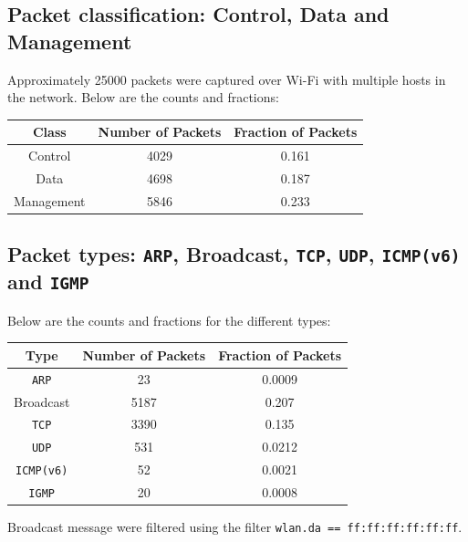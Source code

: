 \documentclass{article}
\begin{document}
\subsection{Packet classification: Control, Data and Management}
\begin{flushleft}
Approximately 25000 packets were captured over Wi-Fi with multiple hosts in the network. Below are the counts and fractions:
\begin{center}
\begin{tabular}{|c|c|c|}
\hline
Class & Number of Packets & Fraction of Packets \\
\hline
\hline
Control & 4029 & 0.161 \\
\hline
Data & 4698 & 0.187 \\
\hline
Management & 5846 & 0.233 \\
\hline
\end{tabular}
\end{center}
\end{flushleft}

\subsection{Packet types: \texttt{ARP}, Broadcast, \texttt{TCP}, \texttt{UDP}, \texttt{ICMP(v6)} and \texttt{IGMP}}
\begin{flushleft}
Below are the counts and fractions for the different types:
\begin{center}
\begin{tabular}{|c|c|c|}
\hline
Type & Number of Packets & Fraction of Packets \\
\hline
\hline
\texttt{ARP} & 23 & 0.0009 \\
\hline
Broadcast & 5187 & 0.207 \\
\hline
\texttt{TCP} & 3390 & 0.135 \\
\hline
\texttt{UDP} & 531 & 0.0212 \\
\hline
\texttt{ICMP(v6)} & 52 & 0.0021 \\
\hline
\texttt{IGMP} & 20 & 0.0008 \\
\hline
\end{tabular}
\end{center}
Broadcast message were filtered using the filter \texttt{wlan.da == ff:ff:ff:ff:ff:ff}.
\end{flushleft}
\end{document}

